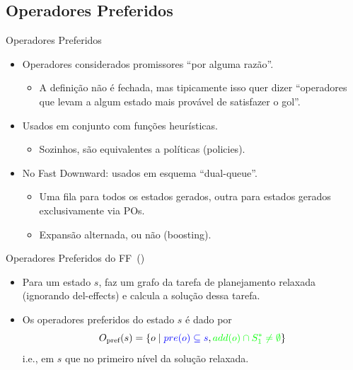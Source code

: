\documentclass{beamer}
\begin{document}
\subsection{Operadores Preferidos}
\begin{frame}{Operadores Preferidos}
\begin{itemize}
\item \alert{Operadores} considerados \alert{promissores} ``por alguma razão''.
    \pause
  \begin{itemize}
  \item A definição não é fechada, mas tipicamente isso quer dizer ``operadores que levam a algum estado mais provável de satisfazer o gol''. %
  \end{itemize}
  \pause
\item Usados em conjunto com funções heurísticas.
  \begin{itemize}
  \item Sozinhos, são equivalentes a políticas (policies).
  \end{itemize}
\pause
\item No Fast Downward: usados em esquema ``\alert{dual-queue}''.
  \begin{itemize}
  \item Uma fila para todos os estados gerados, outra para \alert{estados gerados exclusivamente via POs}.
  \item Expansão alternada, ou não (\alert{boosting}).
  \end{itemize}
\end{itemize}
\end{frame}

\begin{frame}{Operadores Preferidos do FF~(\cite{Hoffmann.Nebel/2001})}
\begin{itemize}
\item Para um estado $s$, faz um grafo da tarefa de planejamento \alert{relaxada} (ignorando del-effects) e calcula a solução dessa tarefa.
\pause
\item Os operadores preferidos do estado $s$ é dado por $$O_{\text{pref}}(s) = \{o \mid {\color{blue} pre(o) \subseteq s}, {\color{green} add(o) \cap S_{1}^{*} \neq \emptyset} \}$$
i.e.,  em $s$ que  no primeiro nível da solução relaxada.
\end{itemize}
\end{frame}
\end{document}
